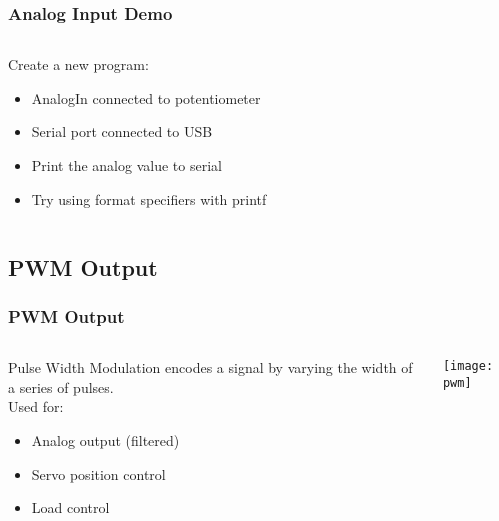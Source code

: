 \begin{frame}[fragile]
	\frametitle{Analog Input Demo}
	\begin{columns}[T]
		\begin{column}{0.5\textwidth}
			Create a new program:
			\begin{itemize}
				\item AnalogIn connected to potentiometer
				\item Serial port connected to USB
				\item Print the analog value to serial
				\item Try using format specifiers with printf
			\end{itemize}
		\end{column}
		\pause
		\begin{column}{0.5\textwidth}
			
		\end{column}
	\end{columns}
\end{frame}

\subsection{PWM Output}
\label{sub:pwm_output}
\begin{frame}
	\frametitle{PWM Output}
	\begin{columns}[c]
		\begin{column}{0.5\textwidth}
			Pulse Width Modulation encodes a signal by varying the width of a series of pulses.\\
			\bigskip
			Used for:
			\begin{itemize}
				\item Analog output (filtered)
				\item Servo position control
				\item Load control
			\end{itemize}
		\end{column}
		\begin{column}{0.5\textwidth}
			\texttt{[image: pwm]}
		\end{column}
	\end{columns}
\end{frame}

